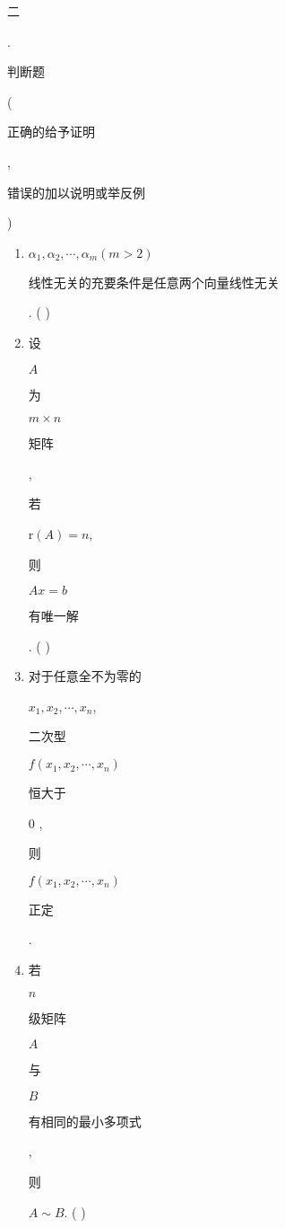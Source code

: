 \documentclass[10pt]{article}
\begin{document}
\begin{CJK}{UTF8}{mj}二\end{CJK}. \begin{CJK}{UTF8}{mj}判断题\end{CJK} (\begin{CJK}{UTF8}{mj}正确的给予证明\end{CJK}, \begin{CJK}{UTF8}{mj}错误的加以说明或举反例\end{CJK})

\begin{enumerate}
  \item $\alpha_{1}, \alpha_{2}, \cdots, \alpha_{m}(m>2)$ \begin{CJK}{UTF8}{mj}线性无关的充要条件是任意两个向量线性无关\end{CJK}. ( )

  \item \begin{CJK}{UTF8}{mj}设\end{CJK} $A$ \begin{CJK}{UTF8}{mj}为\end{CJK} $m \times n$ \begin{CJK}{UTF8}{mj}矩阵\end{CJK}, \begin{CJK}{UTF8}{mj}若\end{CJK} $\mathrm{r}(A)=n$, \begin{CJK}{UTF8}{mj}则\end{CJK} $A x=b$ \begin{CJK}{UTF8}{mj}有唯一解\end{CJK}. ( )

  \item \begin{CJK}{UTF8}{mj}对于任意全不为零的\end{CJK} $x_{1}, x_{2}, \cdots, x_{n}$, \begin{CJK}{UTF8}{mj}二次型\end{CJK} $f\left(x_{1}, x_{2}, \cdots, x_{n}\right)$ \begin{CJK}{UTF8}{mj}恒大于\end{CJK} 0 , \begin{CJK}{UTF8}{mj}则\end{CJK} $f\left(x_{1}, x_{2}, \cdots, x_{n}\right)$ \begin{CJK}{UTF8}{mj}正定\end{CJK}.

  \item \begin{CJK}{UTF8}{mj}若\end{CJK} $n$ \begin{CJK}{UTF8}{mj}级矩阵\end{CJK} $A$ \begin{CJK}{UTF8}{mj}与\end{CJK} $B$ \begin{CJK}{UTF8}{mj}有相同的最小多项式\end{CJK}, \begin{CJK}{UTF8}{mj}则\end{CJK} $A \sim B$. ( )


\end{enumerate}
\end{document}
